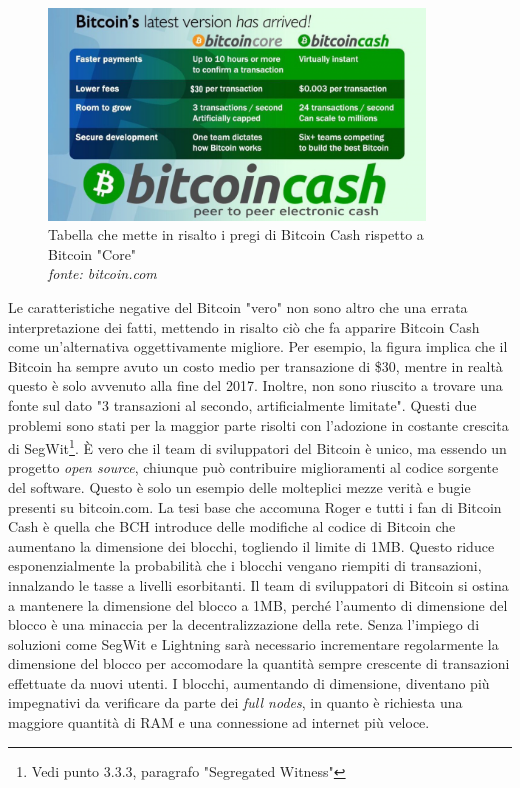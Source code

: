 \documentclass {article}
\begin{document}
\vspace {0.5cm}
\begin{figure}[htb!]
\includegraphics [width = 10cm] {bcash.png}
\centering
\captionsetup{width=1.4\linewidth}
\caption {Tabella che mette in risalto i pregi di Bitcoin Cash rispetto a Bitcoin "Core"\\\textit{fonte: bitcoin.com}}
\end{figure}
\vspace {0.2cm}
\noindent
%
Le caratteristiche negative del Bitcoin "vero" non sono altro che una errata interpretazione dei fatti, mettendo in risalto ciò che fa apparire Bitcoin Cash come un'alternativa oggettivamente migliore.
Per esempio, la figura implica che il Bitcoin ha sempre avuto un costo medio per transazione di \$30, mentre in realtà questo è solo avvenuto alla fine del 2017.
Inoltre, non sono riuscito a trovare una fonte sul dato "3 transazioni al secondo, artificialmente limitate".
Questi due problemi sono stati per la maggior parte risolti con l'adozione in costante crescita di SegWit\footnote{Vedi punto 3.3.3, paragrafo "Segregated Witness"}.
È vero che il team di sviluppatori del Bitcoin è unico, ma essendo un progetto \textit{open source}, chiunque può contribuire miglioramenti al codice sorgente del software.
Questo è solo un esempio delle molteplici mezze verità e bugie presenti su bitcoin.com.
La tesi base che accomuna Roger e tutti i fan di Bitcoin Cash è quella che BCH introduce delle modifiche al codice di Bitcoin che aumentano la dimensione dei blocchi, togliendo il limite di 1MB.
Questo riduce esponenzialmente la probabilità che i blocchi vengano riempiti di transazioni, innalzando le tasse a livelli esorbitanti.
Il team di sviluppatori di Bitcoin si ostina a mantenere la dimensione del blocco a 1MB, perché l'aumento di dimensione del blocco è una minaccia per la decentralizzazione della rete.
Senza l'impiego di soluzioni come SegWit e Lightning sarà necessario incrementare regolarmente la dimensione del blocco per accomodare la quantità sempre crescente di transazioni effettuate da nuovi utenti.
I blocchi, aumentando di dimensione, diventano più impegnativi da verificare da parte dei \textit{full nodes}, in quanto è richiesta una maggiore quantità di RAM e una connessione ad internet più veloce.
\end{document}
